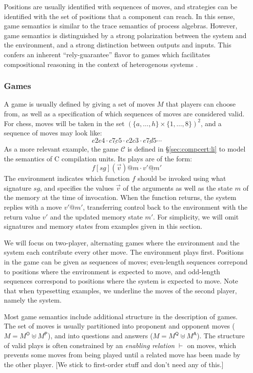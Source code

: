 \documentclass[acmsmall,timestamp,review,anonymous]{acmart}
\newcommand{\kw}[1]{\ensuremath{ \mathsf{#1} }}
\begin{document}
Positions are usually identified with sequences of moves,
and strategies can be identified with the set of positions
that a component can reach.
In this sense,
game semantics is similar to
the trace semantics of process algebras.
However, game semantics is distinguished
by a strong polarization between
the system and the environment,
and a strong distinction between outputs and inputs.
This confers an inherent ``rely-guarantee'' flavor
to games which facilitates compositional reasoning
in the context of heterogenous systems \cite{cspgs}.


\subsubsection{Games} %

A game is usually defined by giving a set of moves $M$
that players can choose from,
as well as a specification of which
sequences of moves are considered valid.
For chess,
moves will be taken in the set $(\{a, \ldots, h\} \times \{1, \ldots, 8\})^2$,
and a sequence of moves may look like:
\[ e2e4 \cdot \underline{c7c5} \cdot c2c3 \cdot \underline{e7d5} \cdots \]
As a more relevant example,
the game $\mathcal{C}$ is defined in \S\ref{sec:compcert:li}
to model the semantics of C compilation units.
Its plays are of the form:
\[ f[sg](\vec{v})@m \cdot \underline{v'@m'} \]
The environment indicates
which function $f$ should be invoked
using what signature $sg$,
and specifies the values $\vec{v}$ of the arguments
as well as the state $m$ of the memory
at the time of invocation.
When the function returns,
the system replies with a move $v'@m'$,
transferring control back to the environment
with the return value $v'$
and the updated memory state $m'$.
For simplicity,
we will omit signatures and memory states
from examples given in this section.

We will focus on two-player, alternating games
where the environment and the system each contribute every other move.
The environment plays first.
Positions in the game can be given
as sequences of moves;
even-length sequences correpond to positions
where the environment is expected to move,
and odd-length sequences correspond to positions
where the system is expected to move.
Note that when typesetting examples,
we underline the moves of the second player,
namely the system.

Most game semantics
include additional structure
in the description of games.
The set of moves is usually partitioned
into proponent and opponent moves ($M = M^\kw{O} \uplus M^\kw{P}$),
and into questions and answers ($M = M^\kw{Q} \uplus M^\kw{A}$).
The structure of valid plays
is often constrained by an \emph{enabling relation} $\vdash$
on moves,
which prevents some moves from being played
until a related move has been made by the other player.
[We stick to first-order stuff and don't need any of this.]
\end{document}
